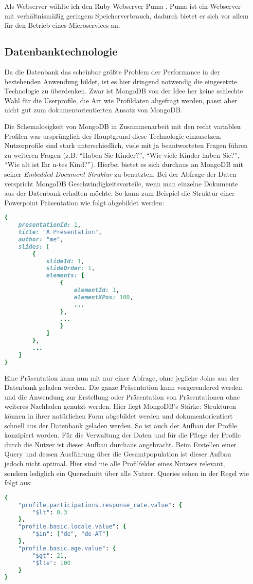 Als Webserver wählte ich den Ruby Webserver Puma \cite{puma}. Puma ist ein Webserver mit verhältnismäßig geringem Speicherverbrauch, dadurch bietet er sich vor allem für den Betrieb eines Microservices an.
\subsection{Datenbanktechnologie}
Da die Datenbank das scheinbar größte Problem der Performance in der bestehenden Anwendung bildet, ist es hier dringend notwendig die eingesetzte Technologie zu überdenken. 
Zwar ist MongoDB von der Idee her keine schlechte Wahl für die Userprofile, die Art wie Profildaten abgefragt werden, passt aber nicht gut zum dokumentorientierten Ansatz von MongoDB.

Die Schemalosigkeit von MongoDB in Zusammenarbeit mit den recht variablen Profilen war ursprünglich der Hauptgrund diese Technologie einzusetzen. Nutzerprofile sind stark unterschiedlich, viele mit ja beantworteten Fragen führen zu weiteren Fragen (z.B. ``Haben Sie Kinder?'', ``Wie viele Kinder haben Sie?'', ``Wie alt ist Ihr n-tes Kind?''). Hierbei bietet es sich durchaus an MongoDB mit seiner \textit{Embedded Document Struktur} zu benutzten.
Bei der Abfrage der Daten verspricht MongoDB Geschwindigkeitsvorteile, wenn man einzelne Dokumente aus der Datenbank erhalten möchte. So kann zum Beispiel die Struktur einer Powerpoint Präsentation wie folgt abgebildet werden:
\begin{lstlisting}[language=Ruby]
{
    presentationId: 1,
    title: "A Presentation",
    author: "me",
    slides: [
        {
            slideId: 1,
            slideOrder: 1,
            elements: [
                {
                    elementId: 1,
                    elementXPos: 100,
                    ...
                },
                ...
                }
            ]
        },
        ...
    ]
}
\end{lstlisting}
Eine Präsentation kann nun mit nur einer Abfrage, ohne jegliche Joins aus der Datenbank geladen werden. Die ganze Präsentation kann vorgerendered werden und die Anwendung zur Erstellung oder Präsentation von Präsentationen ohne weiteres Nachladen genutzt werden. Hier liegt MongoDB's Stärke: Strukturen können in ihrer natürlichen Form abgebildet werden und dokumentorientiert schnell aus der Datenbank geladen werden.
So ist auch der Aufbau der Profile konzipiert worden. Für die Verwaltung der Daten und für die Pflege der Profile durch die Nutzer ist dieser Aufbau durchaus angebracht.
Beim Erstellen einer Query und dessen Ausführung über die Gesamtpopulation ist dieser Aufbau jedoch nicht optimal. Hier sind nie alle Profilfelder eines Nutzers relevant, sondern lediglich ein Querschnitt über alle Nutzer. Queries sehen in der Regel wie folgt aus:
\begin{lstlisting}[language=Ruby]
{
    "profile.participations.response_rate.value": {
        "$lt": 0.3
    },
    "profile.basic.locale.value": {
        "$in": ["de", "de-AT"]
    },
    "profile.basic.age.value": {
        "$gt": 21,
        "$lte": 100
    }
}
\end{lstlisting}

